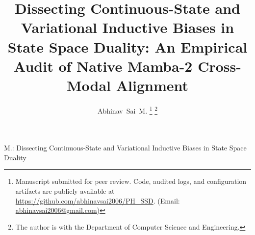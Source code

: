\documentclass[10pt,journal,final]{IEEEtran}
\begin{document}
\title{Dissecting Continuous-State and Variational Inductive Biases in State Space Duality: An Empirical Audit of Native Mamba-2 Cross-Modal Alignment}

\author{Abhinav~Sai~M.%
\thanks{Manuscript submitted for peer review. Code, audited logs, and configuration artifacts are publicly available at \protect\url{https://github.com/abhinavsai2006/PH_SSD}. (Email: \protect\url{abhinavsai2006@gmail.com})}%
\thanks{The author is with the Department of Computer Science and Engineering.}%
}

%
{M.: Dissecting Continuous-State and Variational Inductive Biases in State Space Duality}

\maketitle
\end{document}
